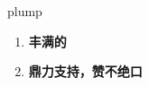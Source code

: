 
\begin{frame}
{\huge plump}
\begin{center}
\begin{enumerate}\Large
  \item \textbf{丰满的}
  \item \textbf{鼎力支持，赞不绝口}
\end{enumerate}
\end{center}
\end{frame}
